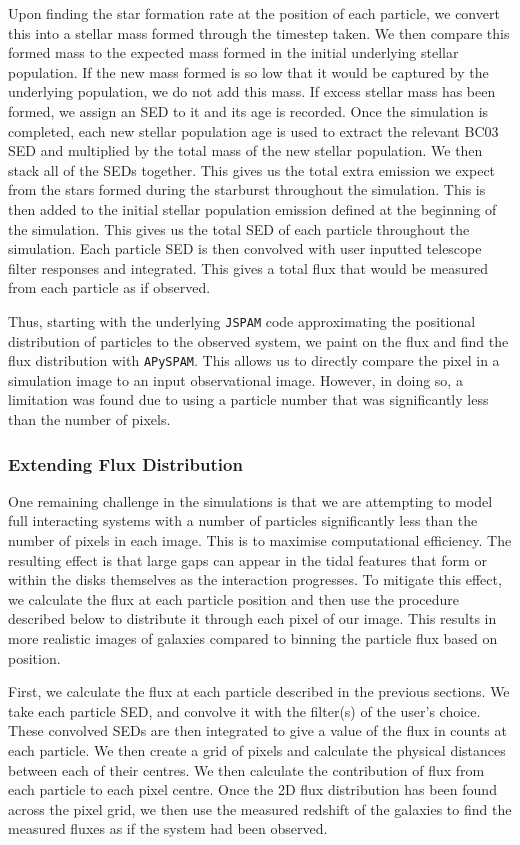 Upon finding the star formation rate at the position of each particle, we convert this into a stellar mass formed through the timestep taken. We then compare this formed mass to the expected mass formed in the initial underlying stellar population. If the new mass formed is so low that it would be captured by the underlying population, we do not add this mass. If excess stellar mass has been formed, we assign an SED to it and its age is recorded. Once the simulation is completed, each new stellar population age is used to extract the relevant BC03 SED and multiplied by the total mass of the new stellar population. We then stack all of the SEDs together. This gives us the total extra emission we expect from the stars formed during the starburst throughout the simulation. This is then added to the initial stellar population emission defined at the beginning of the simulation. This gives us the total SED of each particle throughout the simulation. Each particle SED is then convolved with user inputted telescope filter responses and integrated. This gives a total flux that would be measured from each particle as if observed. 

Thus, starting with the underlying \texttt{JSPAM} code approximating the positional distribution of particles to the observed system, we paint on the flux and find the flux distribution with \texttt{APySPAM}. This allows us to directly compare the pixel in a simulation image to an input observational image. However, in doing so, a limitation was found due to using a particle number that was significantly less than the number of pixels.

\subsubsection{Extending Flux Distribution}\label{flux_dist}
\noindent One remaining challenge in the simulations is that we are attempting to model full interacting systems with a number of particles significantly less than the number of pixels in each image. This is to maximise computational efficiency. The resulting effect is that large gaps can appear in the tidal features that form or within the disks themselves as the interaction progresses. To mitigate this effect, we calculate the flux at each particle position and then use the procedure described below to distribute it through each pixel of our image. This results in more realistic images of galaxies compared to binning the particle flux based on position.

First, we calculate the flux at each particle described in the previous sections. We take each particle SED, and convolve it with the filter(s) of the user's choice. These convolved SEDs are then integrated to give a value of the flux in counts at each particle. We then create a grid of pixels and calculate the physical distances between each of their centres. We then calculate the contribution of flux from each particle to each pixel centre. Once the 2D flux distribution has been found across the pixel grid, we then use the measured redshift of the galaxies to find the measured fluxes as if the system had been observed.

